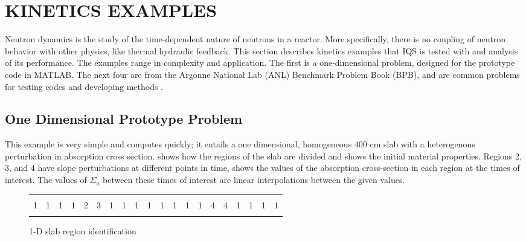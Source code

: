 %
%
%



\chapter{KINETICS EXAMPLES}

Neutron dynamics is the study of the time-dependent nature of neutrons in a reactor.  More specifically, there is no coupling of neutron behavior with other physics, like thermal hydraulic feedback.  This section describes kinetics examples that IQS is tested with and analysis of its performance.  The examples range in complexity and application.  The first is a one-dimensional problem, designed for the prototype code in MATLAB.  The next four are from the Argonne National Lab (ANL) Benchmark Problem Book (BPB), and are common problems for testing codes and developing methods \cite{ANL_BPB}. 

\section{One Dimensional Prototype Problem}

This example is very simple and computes quickly; it entails a one dimensional, homogeneous 400 cm slab with a heterogenous perturbation in absorption cross section.   shows how the regions of the slab are divided and  shows the initial material properties.  Regions 2, 3, and 4 have slope perturbations at different points in time,  shows the values of the absorption cross-section in each region at the times of interest.  The values of $\Sigma_a$ between these times of interest are linear interpolations between the given values.

\begin{figure}[!htbp]
\begin{center}
\begin{tabular}{| l | l | l | l | l | l | l | l | l | l | l | l | l | l | l | l | l | l | l | l |}
\hline \hline \hline
  &   &   &   &   &   &    &    &   &   &   &   &   &   &   &   &   &   &   &   \\
1 & 1 & 1 & 1 & 2 & 3 & 1 & 1 & 1 & 1 & 1 & 1 & 1 & 1 & 4 & 4 & 1 & 1 & 1 & 1 \\
  &   &   &   &   &   &    &    &   &   &   &   &   &   &   &   &   &   &   &   \\
\hline \hline \hline
\end{tabular}
\caption{1-D slab region identification}
\label{fig:slab}
\end{center}
\end{figure}

